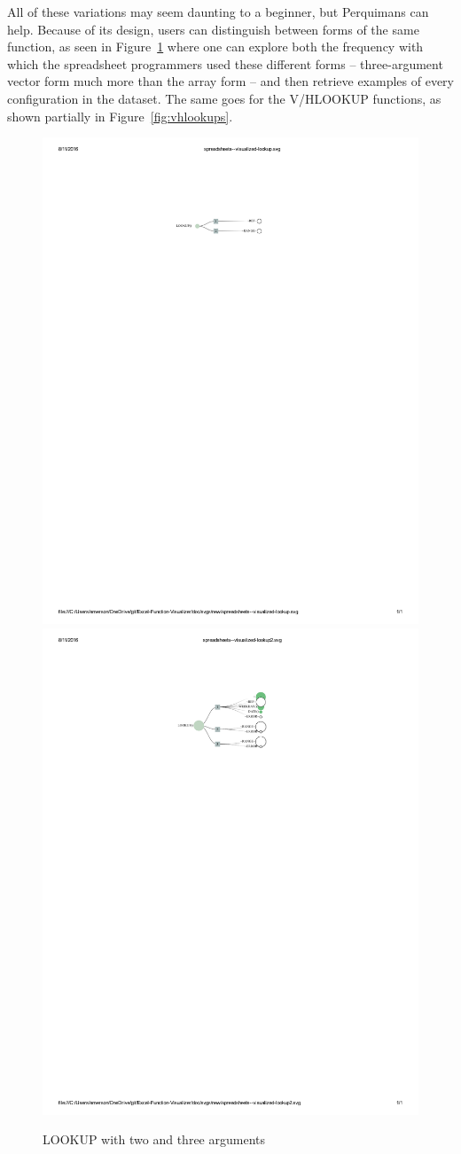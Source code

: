 \documentclass[conference]{IEEEtran}
\newcommand{\toolname}{Perquimans\xspace} \newcommand{\toolnameend}{Perquimans}
\begin{document}
	All of these variations may seem daunting to a beginner, but \toolname can
	help. Because of its design, users can distinguish between forms of the same
	function, as seen in Figure~\ref{fig:lookups} where one can explore both the
	frequency with which the spreadsheet programmers used these different forms --
	three-argument vector form much more than the array form -- and then retrieve
	examples of every configuration in the dataset. The same goes for the V/HLOOKUP
	functions, as shown partially in Figure~\ref{fig:vhlookups}.
	
	\begin{figure}[h] \centering \includegraphics[width=.5\textwidth]{lookup-2}
		\includegraphics[width=.5\textwidth]{lookup-3} \caption{LOOKUP with two and
			three arguments}  \label{fig:lookups} \end{figure}
	
\end{document}
